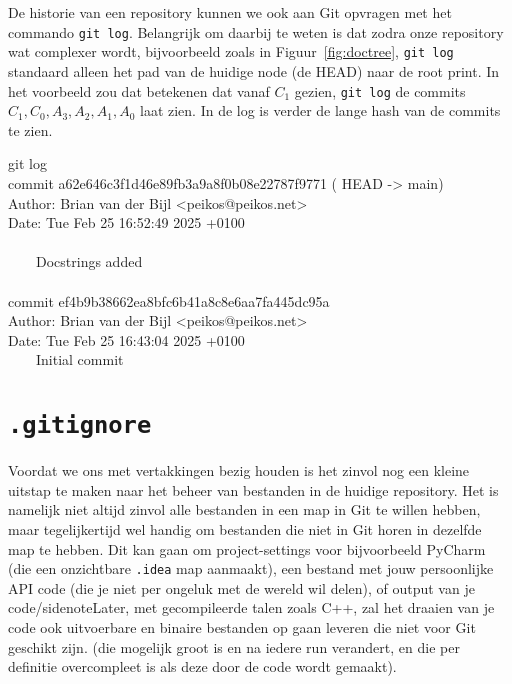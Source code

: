 De historie van een repository kunnen we ook aan Git opvragen met het commando \texttt{git log}. Belangrijk om daarbij te weten is dat zodra onze repository wat complexer wordt, bijvoorbeeld zoals in Figuur~\ref{fig:doctree}, \texttt{git log} standaard alleen het pad van de huidige node (de HEAD) naar de root print. In het voorbeeld zou dat betekenen dat vanaf $C_1$ gezien, \texttt{git log} de commits $C_1, C_0, A_3, A_2, A_1, A_0$ laat zien. In de log is verder de lange hash van de commits te zien.

\begin{bash}
 git log \\
{\color{ttyellow} commit a62e646c3f1d46e89fb3a9a8f0b08e22787f9771 ({\color{ttcyan} HEAD} -> {\color{ttgreen}  main})}\\
Author: Brian van der Bijl <peikos@peikos.net>\\
Date:   Tue Feb 25 16:52:49 2025 +0100\\
~ \\
\ \ \ \ Docstrings added\\
~ \\
{\color{ttyellow} commit ef4b9b38662ea8bfc6b41a8c8e6aa7fa445dc95a}\\
Author: Brian van der Bijl <peikos@peikos.net>\\
Date:   Tue Feb 25 16:43:04 2025 +0100
~ \\
\ \ \ \  Initial commit\\
\end{bash}



\section{\tt .gitignore} \label{sec:gitignore}
Voordat we ons met vertakkingen bezig houden is het zinvol nog een kleine uitstap te maken naar het beheer van bestanden in de huidige repository. Het is namelijk niet altijd zinvol alle bestanden in een map in Git te willen hebben, maar tegelijkertijd wel handig om bestanden die niet in Git horen in dezelfde map te hebben. Dit kan gaan om project-settings voor bijvoorbeeld PyCharm (die een onzichtbare \texttt{.idea} map aanmaakt), een bestand met jouw persoonlijke API code (die je niet per ongeluk met de wereld wil delen), of output van je code/sidenote{Later, met gecompileerde talen zoals C++, zal het draaien van je code ook uitvoerbare en binaire bestanden op gaan leveren die niet voor Git geschikt zijn.} (die mogelijk groot is en na iedere run verandert, en die per definitie overcompleet is als deze door de code wordt gemaakt).

